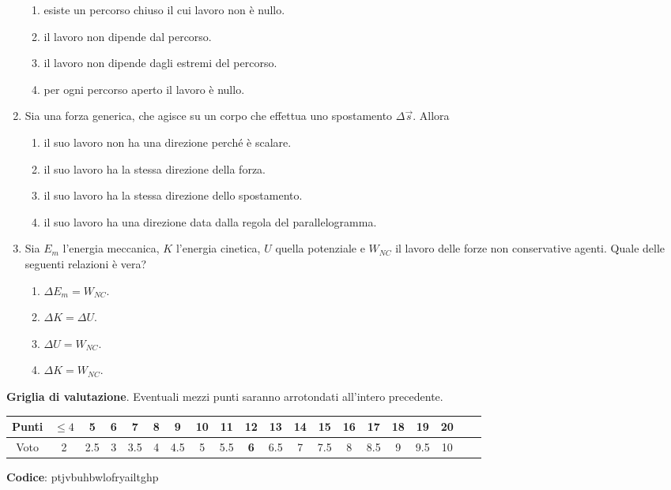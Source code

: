 \documentclass{article}
\begin{document}
\begin{enumerate}
\begin{enumerate}[label=\Alph*.]
    \item esiste un percorso chiuso il cui lavoro non è nullo.
    \item il lavoro non dipende dal percorso.
    \item il lavoro non dipende dagli estremi del percorso.
    \item per ogni percorso aperto il lavoro è nullo.
  \end{enumerate}
  \item Sia  una forza generica, che agisce su un corpo che effettua uno spostamento $\Delta \vec{s}$. Allora
  \begin{enumerate}[label=\Alph*.]
    \item il suo lavoro non ha una direzione perché è scalare.
    \item il suo lavoro ha la stessa direzione della forza.
    \item il suo lavoro ha la stessa direzione dello spostamento.
    \item il suo lavoro ha una direzione data dalla regola del parallelogramma.
  \end{enumerate}
  \item Sia $E_m$ l'energia meccanica, $K$ l'energia cinetica, $U$ quella potenziale e $W_{NC}$ il lavoro delle forze non conservative agenti. Quale delle seguenti relazioni è vera?
  \begin{enumerate}[label=\Alph*.]
    \item $\Delta E_m=W_{NC}$.
    \item $\Delta K = \Delta U$.
    \item $\Delta U=W_{NC}$.
    \item $\Delta K=W_{NC}.$
  \end{enumerate}
\end{enumerate}








\newpage \maketitle \centering \textbf{Griglia di valutazione}. Eventuali mezzi punti saranno arrotondati all'intero precedente. \begin{table}[h]     \centering \begin{tabular}{|c|c|c|c|c|c|c|c|c|c|c|c|c|c|c|c|c|c|c|c|} \hline Punti &  $\leq 4$ & 5 & 6 & 7 & 8 & 9 & 10 & 11 & \textbf{12} & 13 & 14 & 15 & 16 & 17 & 18 & 19 & 20 \\ \hline Voto & 2 & 2.5 & 3 & 3.5 & 4 & 4.5 & 5 & 5.5 & \textbf{6} & 6.5 & 7 & 7.5 & 8 & 8.5 & 9 & 9.5 & 10 \\ \hline \end{tabular} \end{table} 
\textbf{Codice}: ptjvbuhbwlofryailtghp
\end{document}
